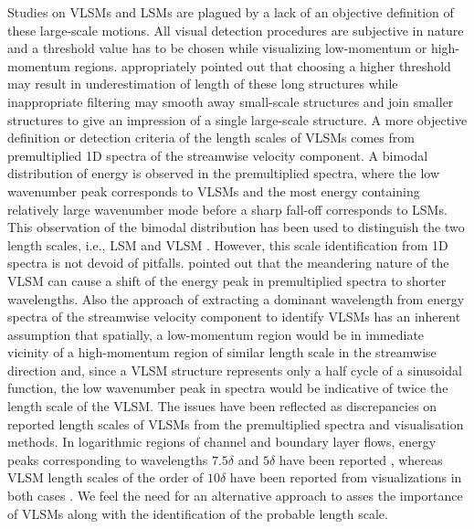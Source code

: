 Studies on VLSMs and LSMs are plagued by a lack of an objective definition of these large-scale motions. All visual detection procedures are subjective in nature and a threshold value has to be chosen while visualizing low-momentum or high-momentum regions. \citet{dennis_nickels_jfm2011} appropriately pointed out that choosing a higher threshold may result in underestimation of length of these long structures while inappropriate filtering may smooth away small-scale structures and join smaller structures to give an impression of a single large-scale structure. A more objective definition or detection criteria of the length scales of VLSMs comes from premultiplied 1D spectra of the streamwise velocity component. A bimodal distribution of energy is observed in the premultiplied spectra, where the low wavenumber peak corresponds to VLSMs and the most energy containing relatively large wavenumber mode before a sharp fall-off corresponds to LSMs. This observation of the bimodal distribution has been used to distinguish the two length scales, i.e., LSM and VLSM \citep{kim_adrian_pof99,balakumar_adrian_ptrs_07,guala_adrian_jfm2006}. However, this scale identification from 1D spectra is not devoid of pitfalls. \citet{hutchins_marusic_jfm2007}  pointed out that the meandering nature of the VLSM can cause a shift of the energy peak in premultiplied spectra to shorter wavelengths. Also the approach of extracting a dominant wavelength from energy spectra of the streamwise velocity component to identify VLSMs has an inherent assumption \citep{baltzer_jfm_13} that spatially, a low-momentum region would be in immediate vicinity of a high-momentum region of similar length scale in the streamwise direction and, since a VLSM structure represents only a half cycle of a sinusoidal function, the low wavenumber peak in spectra would be indicative of twice the length scale of the VLSM. The issues have been reflected as discrepancies on reported length scales of VLSMs from the premultiplied spectra and visualisation methods. In logarithmic regions of channel and boundary layer flows, energy peaks corresponding to wavelengths $7.5\delta$ and $5\delta$ have been reported \citep{balakumar_adrian_ptrs_07}, whereas VLSM length scales of the order of $10\delta$ have been reported from visualizations in both cases \citep{Lee_sung_jfm11,lee_sung_jfm_14,hutchins_marusic_jfm2007}. We feel the need for an alternative approach to asses the importance of VLSMs along with the identification of the probable length scale. 

